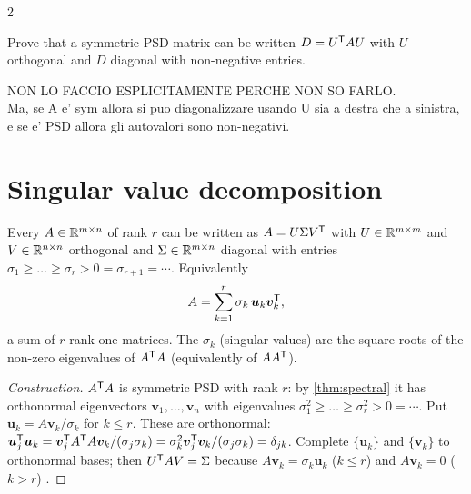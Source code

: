 \begin{paracol}{2}
\begin{exercise}[PS1 (2013), B-3]
Prove that a symmetric PSD matrix can be written $D=U^{\mathsf T} AU$ with $U$ orthogonal and $D$ diagonal with
non-negative entries.
\end{exercise}
\begin{mysolution}
  NON LO FACCIO ESPLICITAMENTE PERCHE NON SO FARLO. \\
  Ma, se A e' sym allora si puo diagonalizzare usando U sia a destra che a sinistra, e se e' PSD allora gli autovalori sono non-negativi.
\end{mysolution}

\section{Singular value decomposition}\label{sec:svd}

\begin{theorem}[SVD]\label{thm:svd}
Every $A\in\mathbb{R}^{m\times n}$ of rank $r$ can be written as $A=U\Sigma V^{\mathsf T}$ with $U\in\mathbb{R}^{m\times m}$ and
$V\in\mathbb{R}^{n\times n}$ orthogonal and $\Sigma\in\mathbb{R}^{m\times n}$ diagonal with entries
$\sigma_1\ge\dots\ge\sigma_r>0=\sigma_{r+1}=\cdots$. Equivalently
\begin{equation}\label{eq:svdsum}
  A=\sum_{k=1}^r\sigma_k\,\bm u_k\bm v_k^{\mathsf T},
\end{equation}
a sum of $r$ rank-one matrices. The $\sigma_k$ (singular values) are the square roots of the non-zero
eigenvalues of $A^{\mathsf T} A$ (equivalently of $AA^{\mathsf T}$).
\end{theorem}
\begin{proof}[Construction]
$A^{\mathsf T} A$ is symmetric PSD with rank $r$: by \cref{thm:spectral} it has orthonormal eigenvectors
$\bm v_1,\dots,\bm v_n$ with eigenvalues $\sigma_1^2\ge\dots\ge\sigma_r^2>0=\cdots$. Put
$\bm u_k=A\bm v_k/\sigma_k$ for $k\le r$. These are orthonormal:
$\bm u_j^{\mathsf T}\bm u_k=\bm v_j^{\mathsf T} A^{\mathsf T} A\bm v_k/(\sigma_j\sigma_k)=\sigma_k^2\bm v_j^{\mathsf T}\bm v_k/(\sigma_j\sigma_k)=\delta_{jk}$.
Complete $\{\bm u_k\}$ and $\{\bm v_k\}$ to orthonormal bases; then $U^{\mathsf T} AV=\Sigma$ because $A\bm v_k=\sigma_k\bm u_k$
($k\le r$) and $A\bm v_k=0$ ($k>r$) .
\end{proof}


\end{paracol}
